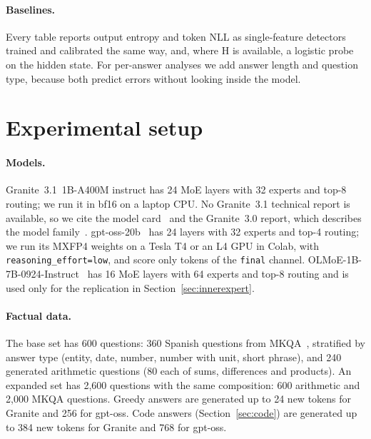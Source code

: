 \documentclass[11pt]{article}
\newcommand{\Hs}{\textsf{H}}
\begin{document}
\paragraph{Baselines.}
Every table reports output entropy and token NLL as single-feature detectors trained and calibrated the same way, and, where \Hs{} is available, a logistic probe on the hidden state.
For per-answer analyses we add answer length and question type, because both predict errors without looking inside the model.

\section{Experimental setup}
\label{sec:setup}

\paragraph{Models.}
Granite~3.1~1B-A400M instruct has 24 MoE layers with 32 experts and top-8 routing; we run it in bf16 on a laptop CPU.
No Granite~3.1 technical report is available, so we cite the model card~\citep{granite31card} and the Granite~3.0 report, which describes the model family~\citep{granite2024granite}.
gpt-oss-20b~\citep{openai2025gptoss} has 24 layers with 32 experts and top-4 routing; we run its MXFP4 weights on a Tesla T4 or an L4 GPU in Colab, with \texttt{reasoning\_effort=low}, and score only tokens of the \texttt{final} channel.
OLMoE-1B-7B-0924-Instruct~\citep{muennighoff2025olmoe} has 16 MoE layers with 64 experts and top-8 routing and is used only for the replication in Section~\ref{sec:innerexpert}.

\paragraph{Factual data.}
The base set has 600 questions: 360 Spanish questions from MKQA~\citep{longpre2021mkqa}, stratified by answer type (entity, date, number, number with unit, short phrase), and 240 generated arithmetic questions (80 each of sums, differences and products).
An expanded set has 2,600 questions with the same composition: 600 arithmetic and 2,000 MKQA questions.
Greedy answers are generated up to 24 new tokens for Granite and 256 for gpt-oss.
Code answers (Section~\ref{sec:code}) are generated up to 384 new tokens for Granite and 768 for gpt-oss.
\end{document}
